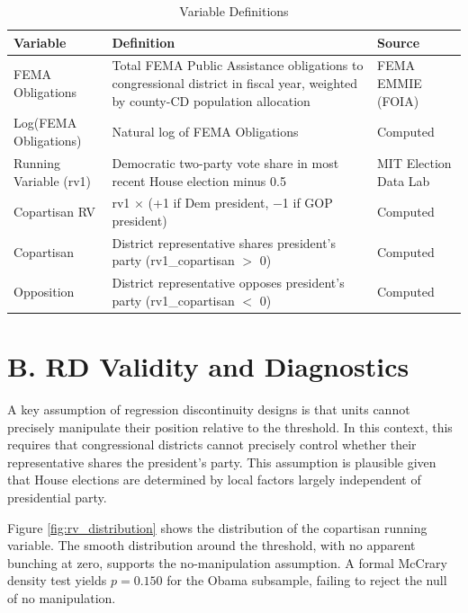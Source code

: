 \documentclass[12pt,letterpaper,oneside]{book}
\begin{document}
\begin{table}[H]
\centering
\caption{Variable Definitions}
\label{tab:variable_definitions}
\begin{tabular}{lp{7.5cm}l}
\toprule
Variable & Definition & Source \\
\midrule
FEMA Obligations & Total FEMA Public Assistance obligations to congressional district in fiscal year, weighted by county-CD population allocation & FEMA EMMIE (FOIA) \\[0.5ex]
Log(FEMA Obligations) & Natural log of FEMA Obligations & Computed \\[0.5ex]
Running Variable (rv1) & Democratic two-party vote share in most recent House election minus 0.5 & MIT Election Data Lab \\[0.5ex]
Copartisan RV & rv1 $\times$ (+1 if Dem president, $-$1 if GOP president) & Computed \\[0.5ex]
Copartisan & District representative shares president's party (rv1\_copartisan $>$ 0) & Computed \\[0.5ex]
Opposition & District representative opposes president's party (rv1\_copartisan $<$ 0) & Computed \\[0.5ex]
\bottomrule
\end{tabular}
\end{table}


\section*{B. RD Validity and Diagnostics}

A key assumption of regression discontinuity designs is that units cannot precisely manipulate their position relative to the threshold. In this context, this requires that congressional districts cannot precisely control whether their representative shares the president's party. This assumption is plausible given that House elections are determined by local factors largely independent of presidential party.

Figure \ref{fig:rv_distribution} shows the distribution of the copartisan running variable. The smooth distribution around the threshold, with no apparent bunching at zero, supports the no-manipulation assumption. A formal McCrary density test yields $p = 0.150$ for the Obama subsample, failing to reject the null of no manipulation.
\end{document}
